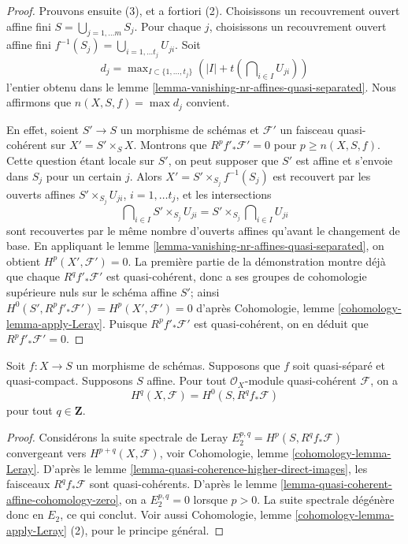 \begin{proof}
\medskip\noindent
Prouvons ensuite (3), et a fortiori (2). Choisissons un recouvrement ouvert affine
fini $S = \bigcup_{j = 1, \ldots m} S_j$. Pour chaque $j$,
choisissons un recouvrement ouvert affine fini
$f^{-1}(S_j) = \bigcup_{i = 1, \ldots t_j} U_{ji} $.
Soit
$$
d_j = \max\nolimits_{I \subset \{1, \ldots, t_j\}}
\left(|I| + t(\bigcap\nolimits_{i \in I} U_{ji})\right)
$$
l'entier obtenu dans le
lemme \ref{lemma-vanishing-nr-affines-quasi-separated}.
Nous affirmons que $n(X, S, f) = \max d_j$ convient.

\medskip\noindent
En effet, soient $S' \to S$ un morphisme de schémas et
$\mathcal{F}'$ un faisceau quasi-cohérent sur $X' = S' \times_S X$.
Montrons que $R^pf'_*\mathcal{F}' = 0$ pour $p \geq n(X, S, f)$.
Cette question étant locale sur $S'$, on peut supposer que $S'$ est affine
et s'envoie dans $S_j$ pour un certain $j$. Alors $X' = S' \times_{S_j} f^{-1}(S_j)$
est recouvert par les ouverts affines $S' \times_{S_j} U_{ji}$, $i = 1, \ldots t_j$,
et les intersections
$$
\bigcap\nolimits_{i \in I} S' \times_{S_j} U_{ji} =
S' \times_{S_j} \bigcap\nolimits_{i \in I} U_{ji}
$$
sont recouvertes par le même nombre d'ouverts affines qu'avant le changement de base. En appliquant
le
lemme \ref{lemma-vanishing-nr-affines-quasi-separated},
on obtient $H^p(X', \mathcal{F}') = 0$. La première partie de la démonstration
montre déjà que chaque $R^qf'_*\mathcal{F}'$ est quasi-cohérent,
donc a ses groupes de cohomologie supérieure nuls sur le schéma affine $S'$;
ainsi $H^0(S', R^pf'_*\mathcal{F}') = H^p(X', \mathcal{F}') = 0$
d'après Cohomologie, lemme \ref{cohomology-lemma-apply-Leray}.
Puisque $R^pf'_*\mathcal{F}'$ est quasi-cohérent,
on en déduit que $R^pf'_*\mathcal{F}' = 0$.
\end{proof}

\begin{lemma}
\label{lemma-quasi-coherence-higher-direct-images-application}
Soit $f : X \to S$ un morphisme de schémas.
Supposons que $f$ soit quasi-séparé et quasi-compact.
Supposons $S$ affine.
Pour tout $\mathcal{O}_X$-module quasi-cohérent $\mathcal{F}$,
on a
$$
H^q(X, \mathcal{F}) = H^0(S, R^qf_*\mathcal{F})
$$
pour tout $q \in \mathbf{Z}$.
\end{lemma}

\begin{proof}
Considérons la suite spectrale de Leray $E_2^{p, q} = H^p(S, R^qf_*\mathcal{F})$
convergeant vers $H^{p + q}(X, \mathcal{F})$, voir
Cohomologie, lemme \ref{cohomology-lemma-Leray}.
D'après le lemme \ref{lemma-quasi-coherence-higher-direct-images},
les faisceaux $R^qf_*\mathcal{F}$ sont quasi-cohérents.
D'après le lemme \ref{lemma-quasi-coherent-affine-cohomology-zero},
on a $E_2^{p, q} = 0$ lorsque $p > 0$.
La suite spectrale dégénère donc en $E_2$, ce qui
conclut. Voir aussi
Cohomologie, lemme \ref{cohomology-lemma-apply-Leray} (2),
pour le principe général.
\end{proof}








